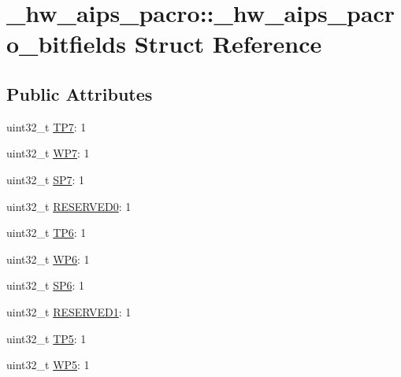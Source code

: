 \hypertarget{struct__hw__aips__pacro_1_1__hw__aips__pacro__bitfields}{}\section{\+\_\+hw\+\_\+aips\+\_\+pacro\+:\+:\+\_\+hw\+\_\+aips\+\_\+pacro\+\_\+bitfields Struct Reference}
\label{struct__hw__aips__pacro_1_1__hw__aips__pacro__bitfields}
\subsection*{Public Attributes}
\begin{DoxyCompactItemize}
\item 
uint32\+\_\+t \hyperlink{struct__hw__aips__pacro_1_1__hw__aips__pacro__bitfields_ac2b0de2581f646a474ddd8e418550e39}{T\+P7}\+: 1
\item 
uint32\+\_\+t \hyperlink{struct__hw__aips__pacro_1_1__hw__aips__pacro__bitfields_a31989000863b0462f4951ecb6836886b}{W\+P7}\+: 1
\item 
uint32\+\_\+t \hyperlink{struct__hw__aips__pacro_1_1__hw__aips__pacro__bitfields_abb07c8c0dab057d373010d445b05995f}{S\+P7}\+: 1
\item 
uint32\+\_\+t \hyperlink{struct__hw__aips__pacro_1_1__hw__aips__pacro__bitfields_a56ad49abc8e408a144058ede996b6135}{R\+E\+S\+E\+R\+V\+E\+D0}\+: 1
\item 
uint32\+\_\+t \hyperlink{struct__hw__aips__pacro_1_1__hw__aips__pacro__bitfields_ab285cdd0bd8f7660fe7adf819cdb13f4}{T\+P6}\+: 1
\item 
uint32\+\_\+t \hyperlink{struct__hw__aips__pacro_1_1__hw__aips__pacro__bitfields_ac1d83f6deaa1321714305dbc86f06f38}{W\+P6}\+: 1
\item 
uint32\+\_\+t \hyperlink{struct__hw__aips__pacro_1_1__hw__aips__pacro__bitfields_ac3d2d8798f58a8eb2f0c85cc7bc0f8b4}{S\+P6}\+: 1
\item 
uint32\+\_\+t \hyperlink{struct__hw__aips__pacro_1_1__hw__aips__pacro__bitfields_aa4216b6befc2f8439cfa195fd77892ce}{R\+E\+S\+E\+R\+V\+E\+D1}\+: 1
\item 
uint32\+\_\+t \hyperlink{struct__hw__aips__pacro_1_1__hw__aips__pacro__bitfields_a6b78ed68e96186ec64e5e709f2ee60c1}{T\+P5}\+: 1
\item 
uint32\+\_\+t \hyperlink{struct__hw__aips__pacro_1_1__hw__aips__pacro__bitfields_aa398be6f511759e67c3f5cb5f975eb6e}{W\+P5}\+: 1

\end{DoxyCompactItemize}
